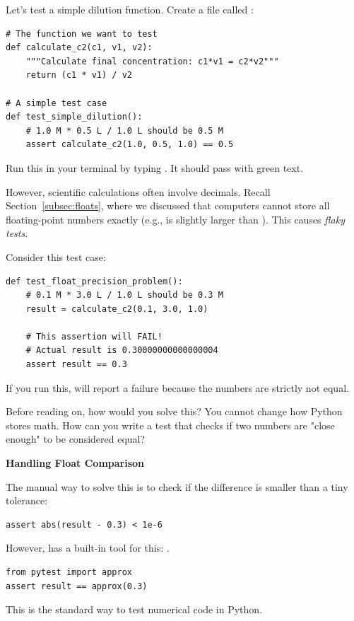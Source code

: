 Let's test a simple dilution function. Create a file called :

\begin{lstlisting}
# The function we want to test
def calculate_c2(c1, v1, v2):
    """Calculate final concentration: c1*v1 = c2*v2"""
    return (c1 * v1) / v2

# A simple test case
def test_simple_dilution():
    # 1.0 M * 0.5 L / 1.0 L should be 0.5 M
    assert calculate_c2(1.0, 0.5, 1.0) == 0.5
\end{lstlisting}

Run this in your terminal by typing . It should pass with green text.

However, scientific calculations often involve decimals. Recall Section~\ref{subsec:floats}, where we discussed that computers cannot store all floating-point numbers exactly (e.g.,  is slightly larger than ). This causes \emph{flaky tests}.

Consider this test case:

\begin{lstlisting}
def test_float_precision_problem():
    # 0.1 M * 3.0 L / 1.0 L should be 0.3 M
    result = calculate_c2(0.1, 3.0, 1.0)
    
    # This assertion will FAIL!
    # Actual result is 0.30000000000000004
    assert result == 0.3
\end{lstlisting}

If you run this,  will report a failure because the numbers are strictly not equal.

\begin{ponder}
Before reading on, how would you solve this? You cannot change how Python stores math. How can you write a test that checks if two numbers are "close enough" to be considered equal?
\end{ponder}

\begin{tip}
\textbf{Handling Float Comparison}

The manual way to solve this is to check if the difference is smaller than a tiny tolerance:
\begin{lstlisting}
assert abs(result - 0.3) < 1e-6
\end{lstlisting}

However,  has a built-in tool for this: .
\begin{lstlisting}
from pytest import approx
assert result == approx(0.3)
\end{lstlisting}
This is the standard way to test numerical code in Python.
\end{tip}

